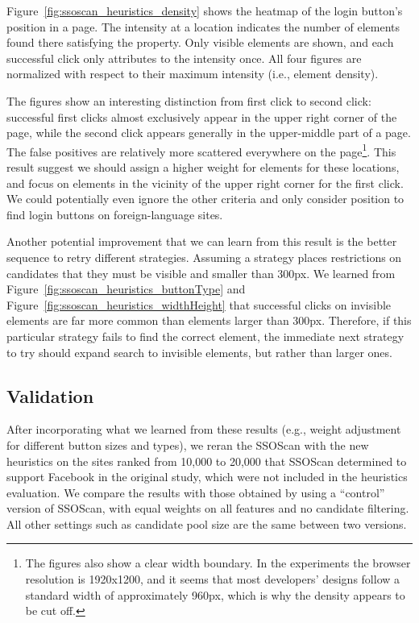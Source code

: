  Figure~\ref{fig:ssoscan_heuristics_density} shows the heatmap of the login button's position in a page.  The intensity at a location indicates the number of elements found there satisfying the property.  Only visible elements are shown, and each successful click only attributes to the intensity once.  All four figures are normalized with respect to their maximum intensity (i.e., element density).

The figures show an interesting distinction from first click to second click: successful first clicks almost exclusively appear in the upper right corner of the page, while the second click appears generally in the upper-middle part of a page.  The false positives are relatively more scattered everywhere on the page\footnote{The figures also show a clear width boundary.  In the experiments the browser resolution is 1920x1200, and it seems that most developers' designs follow a standard width of approximately 960px, which is why the density appears to be cut off.}.  This result suggest we should assign a higher weight for elements for these locations, and focus on elements in the vicinity of the upper right corner for the first click.  We could potentially even ignore the other criteria and only consider position to find login buttons on foreign-language sites.

Another potential improvement that we can learn from this result is the better sequence to retry different strategies.  Assuming a strategy places restrictions on candidates that they must be visible and smaller than 300px.  We learned from Figure~\ref{fig:ssoscan_heuristics_buttonType} and Figure~\ref{fig:ssoscan_heuristics_widthHeight} that successful clicks on invisible elements are far more common than elements larger than 300px.  Therefore, if this particular strategy fails to find the correct element, the immediate next strategy to try should expand search to invisible elements, but rather than larger ones.

\subsection{Validation}
\label{sec:ssoscan_heuristics_laterstudy}

After incorporating what we learned from these results (e.g., weight adjustment for different button sizes and types), we reran the SSOScan with the new heuristics on the sites ranked from 10,000 to 20,000 that SSOScan determined to support Facebook in the original study, which were not included in the heuristics evaluation.  We compare the results with those obtained by using a ``control'' version of SSOScan, with equal weights on all features and no candidate filtering.  All other settings such as candidate pool size are the same between two versions.

